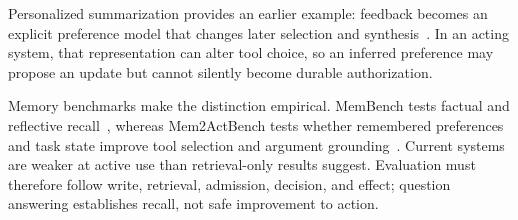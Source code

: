 Personalized summarization provides an earlier example: feedback becomes an explicit preference model that changes later selection and synthesis~\cite{ghodratnama2023personalized,ghodratnama2024sumrecom}. In an acting system, that representation can alter tool choice, so an inferred preference may propose an update but cannot silently become durable authorization.


Memory benchmarks make the distinction empirical. MemBench tests factual and reflective recall~\cite{tan2025membench}, whereas Mem2ActBench tests whether remembered preferences and task state improve tool selection and argument grounding~\cite{shen2026mem2actbench}. Current systems are weaker at active use than retrieval-only results suggest. Evaluation must therefore follow write, retrieval, admission, decision, and effect; question answering establishes recall, not safe improvement to action.

